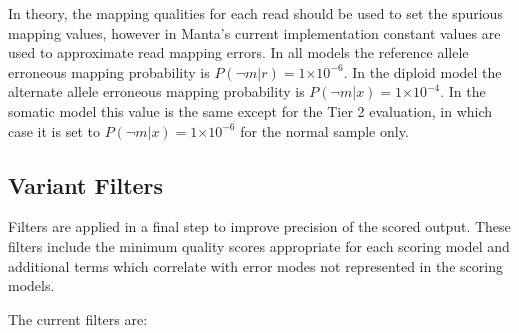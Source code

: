 \documentclass{article}
\newcommand{\e}[1]{\ensuremath{\times 10^{#1}}}
\begin{document}
In theory, the mapping qualities for each read should be used to set the spurious mapping values, however in Manta's current implementation constant values are used to approximate read mapping errors.  In all models the reference allele erroneous mapping probability is $P(\neg m \vert r) =  1\e{-6}$. In the diploid model the alternate allele erroneous mapping probability is $P(\neg m \vert x) =  1\e{-4}$. In the somatic model this value is the same except for the Tier 2 evaluation, in which case it is set to $P(\neg m \vert x) =  1\e{-6}$ for the normal sample only.





\subsection{Variant Filters}

Filters are applied in a final step to improve precision of the scored output. These filters include the minimum quality scores appropriate for each scoring model and additional terms which correlate with error modes not represented in the scoring models.

The current filters are:
\end{document}
